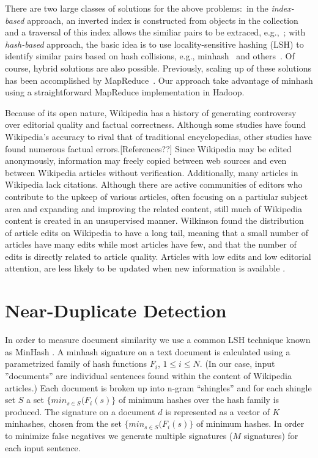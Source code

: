 \documentclass[letterpaper]{article}
\begin{document}
There are two large classes of solutions for the above problems:\ in
the {\it index-based} approach, an inverted index is constructed from
objects in the collection and a traversal of this index allows the
similiar pairs to be extraced,
e.g.,~\cite{Bayardo_etal_WWW2007,lin:brute}; with {\it hash-based}
approach, the basic idea is to use locality-sensitive hashing (LSH) to
identify similar pairs based on hash collisions, e.g., minhash~\cite{broder:resemblance}
and others~\cite{}. Of course, hybrid solutions are also
possible. Previously, scaling up of these solutions has been
accomplished by MapReduce~\cite{zhang:pdc,lin:brute,Vernica_etal_SIGMOD2010}. Our approach
take advantage of minhash using a straightforward MapReduce
implementation in Hadoop.

Because of its open nature, Wikipedia has a history of generating
controversy over editorial quality and factual correctness. Although
some studies have found Wikipedia's accuracy to rival that of
traditional encyclopedias, other studies have found numerous factual
errors.[References??] Since Wikipedia may be edited anonymously,
information may freely copied between web sources and even between
Wikipedia articles without verification. Additionally, many articles
in Wikipedia lack citations. Although there are active communities of
editors who contribute to the upkeep of various articles, often
focusing on a partiular subject area and expanding and improving the
related content, still much of Wikipedia content is created in an
unsupervised manner. Wilkinson found the distribution of article edits
on Wikipedia to have a long tail, meaning that a small number of
articles have many edits while most articles have few, and that the
number of edits is directly related to article quality. Articles with
low edits and low editorial attention, are less likely to be updated
when new information is available \cite{wilkinson:wiki}.

\section{Near-Duplicate Detection}

In order to measure document similarity we use a common LSH technique
known as MinHash \cite{broder:resemblance}. A minhash signature on a
text document is calculated using a parametrized family of hash
functions $F_i$, $1 \le i \le N$. (In our case, input ''documents''
are individual sentences found within the content of Wikipedia
articles.) Each document is broken up into n-gram ``shingles'' and for
each shingle set $S$ a set $\{min_{s \in S}(F_i(s)\}$ of minimum
hashes over the hash family is produced. The signature on a document
$d$ is represented as a vector of $K$ minhashes, chosen from the set
$\{min_{s \in S}(F_i(s)\}$ of minimum hashes. In order to minimize
false negatives we generate multiple signatures ($M$ signatures) for
each input sentence.
\end{document}
